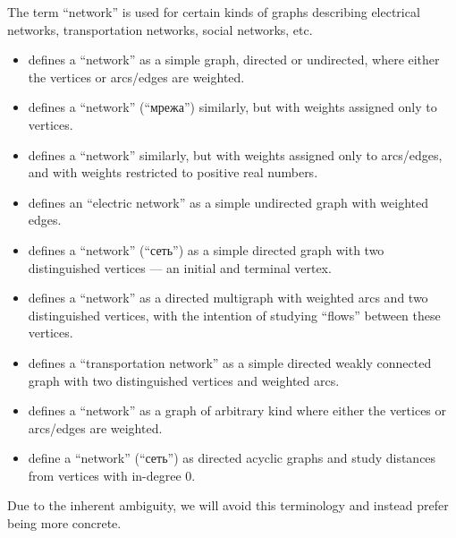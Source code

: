 \begin{remark}\label{rem:graph_network_terminology}
  The term \enquote{network} is used for certain kinds of graphs describing electrical networks, transportation networks, social networks, etc.

  \begin{itemize}
    \item {} defines a \enquote{network} as a simple graph, directed or undirected, where either the vertices or arcs/edges are weighted.

    \item {} defines a \enquote{network} (\enquote{мрежа}) similarly, but with weights assigned only to vertices.

    \item {} defines a \enquote{network} similarly, but with weights assigned only to arcs/edges, and with weights restricted to positive real numbers.

    \item {} defines an \enquote{electric network} as a simple undirected graph with weighted edges.

    \item {} defines a \enquote{network} (\enquote{сеть}) as a simple directed graph with two distinguished vertices --- an initial and terminal vertex.

    \item {} defines a \enquote{network} as a directed multigraph with weighted arcs and two distinguished vertices, with the intention of studying \enquote{flows} between these vertices.

    \item {} defines a \enquote{transportation network} as a simple directed weakly connected graph with two distinguished vertices and weighted arcs.

    \item {} defines a \enquote{network} as a graph of arbitrary kind where either the vertices or arcs/edges are weighted.

    \item {} define a \enquote{network} (\enquote{сеть}) as directed acyclic graphs and study distances from vertices with in-degree \( 0 \).
  \end{itemize}

  Due to the inherent ambiguity, we will avoid this terminology and instead prefer being more concrete.
\end{remark}

